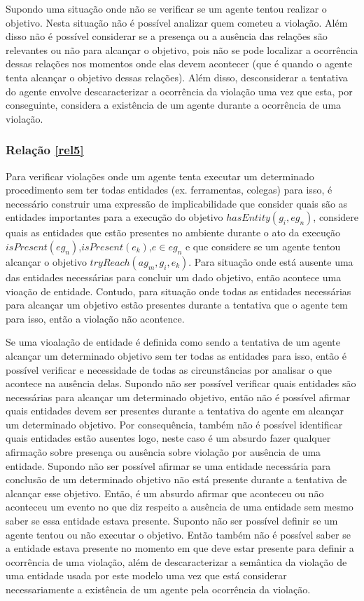 \documentclass[12pt]{article}
\begin{document}
Supondo uma situação onde não se verificar se um agente tentou realizar o objetivo. Nesta situação não é possível analizar quem cometeu a violação. Além disso não é possível considerar se a presença ou a ausência das relações são relevantes ou não para alcançar o objetivo, pois não se pode localizar a ocorrência dessas relações nos momentos onde elas devem acontecer (que é quando o agente tenta alcançar o objetivo dessas relações). Além disso, desconsiderar a tentativa do agente envolve descaracterizar a ocorrência da violação uma vez que esta, por conseguinte, considera a existência de um agente durante a ocorrência de uma violação. 

\subsubsection{Relação \ref{rel5}}

Para verificar violações onde um agente tenta executar um determinado procedimento sem ter todas entidades (ex. ferramentas, colegas) para isso, é necessário construir uma expressão de implicabilidade que consider quais são as entidades importantes para a execução do objetivo $hasEntity(g_i,eg_n)$, considere quais as entidades que estão presentes no ambiente durante o ato da execução $isPresent(eg_n)$,$isPresent(e_k)$,$e \in eg_n$ e que considere se um agente tentou alcançar o objetivo $tryReach(ag_m,g_i,e_k)$. Para situação onde está ausente uma das entidades necessárias para concluir um dado objetivo, então acontece uma vioação de entidade. Contudo, para situação onde todas as entidades necessárias para alcançar um objetivo estão presentes durante a tentativa que o agente tem para isso, então a violação não acontence. 

Se uma vioalação de entidade é definida como sendo a tentativa de um agente alcançar um determinado objetivo sem ter todas as entidades para isso, então é possível verificar e necessidade de todas as circunstâncias por analisar o que acontece na ausência delas. Supondo não ser possível verificar quais entidades são necessárias para alcançar um determinado objetivo, então não é possível afirmar quais entidades devem ser presentes durante a tentativa do agente em alcançar um determinado objetivo. Por consequência, também não é possível identificar quais entidades estão ausentes logo, neste caso é um absurdo fazer qualquer afirmação sobre presença ou ausência sobre violação por ausência de uma entidade. Supondo não ser possível afirmar se uma entidade necessária para conclusão de um determinado objetivo não está presente durante a tentativa de alcançar esse objetivo. Então, é um absurdo afirmar que aconteceu ou não aconteceu um evento no que diz respeito a ausência de uma entidade sem mesmo saber se essa entidade estava presente. Suponto não ser possível definir se um agente tentou ou não executar o objetivo. Então também não é possível saber se a entidade estava presente no momento em que deve estar presente para definir a ocorrência de uma violação, além de descaracterizar a semântica da violação de uma entidade usada por este modelo uma vez que está considerar necessariamente a existência de um agente pela ocorrência da violação. 
\end{document}
